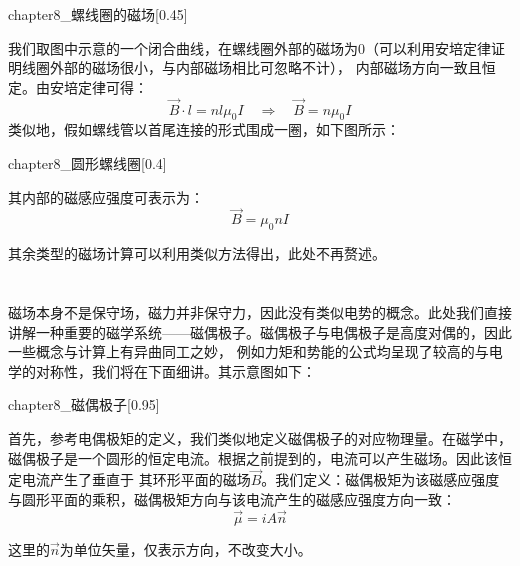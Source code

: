 \begin{Itemize}
    \begin{singlefigure}[螺线圈的磁场分布]{chapter8_螺线圈的磁场}[0.45]
    \end{singlefigure}
    我们取图中示意的一个闭合曲线，在螺线圈外部的磁场为0（可以利用安培定律证明线圈外部的磁场很小，与内部磁场相比可忽略不计），
    内部磁场方向一致且恒定。由安培定律可得：
    \[\vec{B}\cdot l=nl\mu_0I\quad\Rightarrow\quad\vec{B}=n\mu_0 I\]
    类似地，假如螺线管以首尾连接的形式围成一圈，如下图所示：
    \begin{singlefigure}{chapter8_圆形螺线圈}[0.4]
    \end{singlefigure}
    其内部的磁感应强度可表示为：
    \[\vec{B}=\mu_0 nI\]
\end{Itemize}
其余类型的磁场计算可以利用类似方法得出，此处不再赘述。
\section[磁偶极子]{}
磁场本身不是保守场，磁力并非保守力，因此没有类似电势的概念。此处我们直接讲解一种重要的磁学系统——磁偶极子。磁偶极子与电偶极子是高度对偶的，因此一些概念与计算上有异曲同工之妙，
例如力矩和势能的公式均呈现了较高的与电学的对称性，我们将在下面细讲。其示意图如下：
\vspace{2mm}

\begin{minipage}{0.45\textwidth}
    \begin{singlefigure}[磁偶极子]{chapter8_磁偶极子}[0.95]
    \end{singlefigure}
\end{minipage}
\begin{minipage}{0.45\textwidth}
    首先，参考电偶极矩的定义，我们类似地定义磁偶极子的对应物理量。在磁学中，磁偶极子是一个圆形的恒定电流。根据之前提到的，电流可以产生磁场。因此该恒定电流产生了垂直于
    其环形平面的磁场$\vec{B}$。我们定义：磁偶极矩为该磁感应强度与圆形平面的乘积，磁偶极矩方向与该电流产生的磁感应强度方向一致：
    \vspace{-2mm}
    \[\vec{\mu}=iA\vec{n}\]
\end{minipage}
\vspace{2mm}

这里的$\vec{n}$为单位矢量，仅表示方向，不改变大小。

